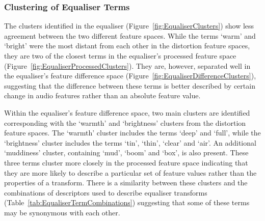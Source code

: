 		\subsubsection*{Clustering of Equaliser Terms}
			The clusters identified in the equaliser (Figure~\ref{fig:EqualiserClusters}) show less agreement
			between the two different feature spaces. While the terms `warm' and `bright' were the most distant
			from each other in the distortion feature spaces, they are two of the closest terms in the
			equaliser's processed feature space (Figure~\ref{fig:EqualiserProcessedClusters}). They are,
			however, separated well in the equaliser's feature difference space
			(Figure~\ref{fig:EqualiserDifferenceClusters}), suggesting that the difference between these terms
			is better described by certain change in audio features rather than an absolute feature value.
			
			Within the equaliser's feature difference space, two main clusters are identified corresponding
			with the `warmth' and `brightness' clusters from the distortion feature spaces. The `warmth'
			cluster includes the terms `deep' and `full', while the `brightness' cluster includes the terms
			`tin', `thin', `clear' and `air'. An additional `muddiness' cluster, containing `mud', `boom' and
			`box', is also present. These three terms cluster more closely in the processed feature space
			indicating that they are more likely to describe a particular set of feature values rather than the
			properties of a transform. There is a similarity between these clusters and the combinations of
			descriptors used to describe equaliser transforms (Table~\ref{tab:EqualiserTermCombinations})
			suggesting that some of these terms may be synonymous with each other.

